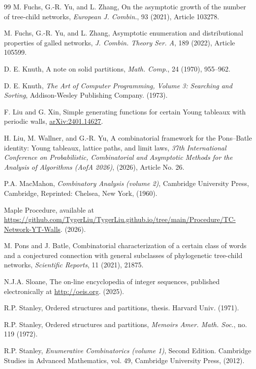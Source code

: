 \documentclass[reqno, 12pt]{article}
\theoremstyle{mydefinition}
\theoremstyle{myremark}
\numberwithin{algorithm}{section}
\begin{document}
\begin{thebibliography}{99}
 M. Fuchs, G.-R. Yu, and  L. Zhang,  On the asymptotic growth of the number of tree-child networks, \emph{European J. Combin.}, 93 (2021), Article 103278.

 M. Fuchs, G.-R. Yu, and L. Zhang, Asymptotic enumeration and distributional properties of galled networks, \emph{J. Combin. Theory Ser. A}, 189 (2022), Article 105599.


 D. E. Knuth, A note on solid partitions, \emph{Math. Comp.}, 24 (1970), 955--962.

 D. E. Knuth, \emph{The Art of Computer Programming, Volume 3: Searching and Sorting}, Addison-Wesley Publishing Company. (1973).

 F. Liu and G. Xin, Simple generating functions for certain Young tableaux with periodic walls, \href{https://arxiv.org/abs/2401.14627}{arXiv:2401.14627}.

 H. Liu, M. Wallner, and G.-R. Yu, A combinatorial framework for the Pons--Batle identity: Young tableaux, lattice paths, and limit laws, \emph{37th International Conference on Probabilistic, Combinatorial and Asymptotic Methods for the Analysis of Algorithms (AofA 2026)}, (2026), Article No. 26.

 P.A. MacMahon, \emph{Combinatory Analysis (volume 2)}, Cambridge University Press, Cambridge, Reprinted: Chelsea, New York, (1960).

 Maple Procedure, available at \url{https://github.com/TygerLiu/TygerLiu.github.io/tree/main/Procedure/TC-Network-YT-Walls}. (2026).

  M. Pons and J. Batle, Combinatorial characterization of a certain class of words and a conjectured connection with general subclasses of phylogenetic tree-child networks, \emph{Scientific Reports}, 11 (2021), 21875.

 N.J.A. Sloane, The on-line encyclopedia of integer sequences, published electronically at \url{http://oeis.org}. (2025).

 R.P. Stanley, Ordered structures and partitions, thesis. Harvard Univ. (1971).

 R.P. Stanley, Ordered structures and partitions, \emph{Memoirs Amer. Math. Soc.}, no. 119 (1972).

 R.P. Stanley, \emph{Enumerative Combinatorics (volume 1)}, Second Edition. Cambridge Studies in Advanced Mathematics, vol. 49, Cambridge University Press, (2012).


\end{thebibliography}
\end{document}
